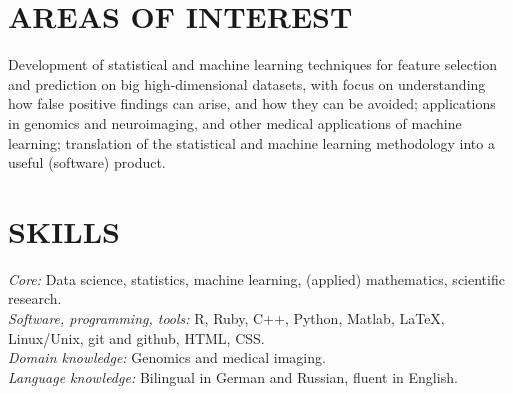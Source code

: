 \documentclass[overlapped, line, 10pt]{res} %
\begin{document}


\address{
  Web: \href{http://www.alexejgossmann.com/}{alexejgossmann.com} \textbar
  LinkedIn: \href{https://www.linkedin.com/in/alexejgossmann/}{alexejgossmann} \textbar
  Github: \href{https://github.com/agisga}{agisga} \textbar
  Email: \href{mailto:agossman@tulane.edu}{agossman@tulane.edu}
}


\begin{resume}




\section{AREAS OF INTEREST}

Development of statistical and machine learning techniques for feature selection and prediction on big high-dimensional datasets, with focus on understanding how false positive findings can arise, and how they can be avoided;
applications in genomics and neuroimaging, and other medical applications of machine learning;
translation of the statistical and machine learning methodology into a useful (software) product.


\section{SKILLS}

{\sl Core:} Data science, statistics, machine learning, (applied) mathematics, scientific research.\\
{\sl Software, programming, tools:} R, Ruby, C++, Python, Matlab, \LaTeX, Linux/Unix, git and github, HTML, CSS.\\
{\sl Domain knowledge:} Genomics and medical imaging.\\
{\sl Language knowledge:} Bilingual in German and Russian, fluent in English.


\end{resume}
\end{document}
